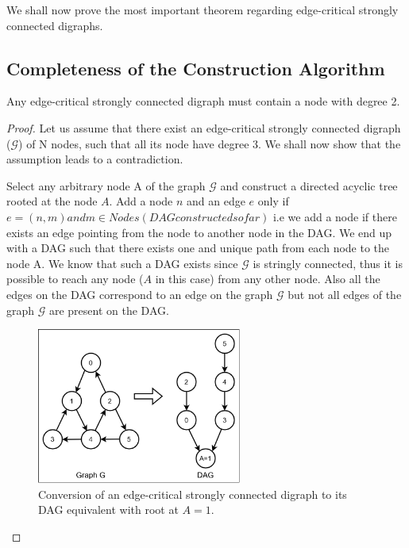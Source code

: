 \documentclass[runningheads]{llncs}
\begin{document}
\noindent We shall now prove the most important theorem regarding edge-critical strongly connected digraphs.

\subsection{Completeness of the Construction Algorithm}

\begin{theorem}
Any edge-critical strongly connected digraph must contain a node with degree 2.
\end{theorem}

\begin{proof}
Let us assume that there exist an edge-critical strongly connected digraph ($\mathcal{G}$) of N nodes, such that all its node have degree 3. We shall now show that the assumption leads to a contradiction. 

Select any arbitrary node A of the graph $\mathcal{G}$ and construct a directed acyclic tree rooted at the node $A$. Add a node $n$ and an edge $e$ only if $e = (n, m) and m \in Nodes(DAG constructed so far)$ i.e we add a node if there exists an edge pointing from the node to another node in the DAG. We end up with a DAG such that there exists one and unique path from each node to the node A. We know that such a DAG exists since $\mathcal{G}$ is stringly connected, thus it is possible to reach any node ($A$ in this case) from any other node. Also all the edges on the DAG correspond to an edge on the graph $\mathcal{G}$ but not all edges of the graph $\mathcal{G}$ are present on the DAG.

\begin{figure}[ht]
    \centering
    \includegraphics[width=0.6\textwidth]{DAG.png}
    \caption{Conversion of an edge-critical strongly connected digraph to its DAG equivalent with root at $A = 1$.}
    \label{fig:dag_conversion}
\end{figure}


\end{proof}
\end{document}
